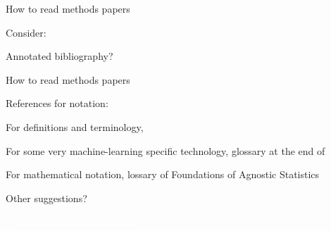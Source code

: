 \documentclass[xcolor={dvipsnames}, handout]{beamer}
\begin{document}
\begin{frame}{How to read methods papers}

Consider:\pause
\begin{wideitemize}
\item Annotated bibliography?
\end{wideitemize}

\end{frame}



\begin{frame}{How to read methods papers}

References for notation:\pause
\begin{wideitemize}
\item For definitions and terminology, \cite{hastie2009elements}
\item For some very machine-learning specific technology, glossary at the end of \cite{breiman2001statistical}
\item For mathematical notation, lossary of \cite{aronow2019foundations} Foundations of Agnostic Statistics
\item Other suggestions?
\end{wideitemize}

\end{frame}




\begin{transitionframe}
\centering

\LARGE \textcolor{white}{Potential outcomes framework.}

\end{transitionframe}
\end{document}
